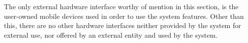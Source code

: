 The only external hardware interface worthy of mention in this section, is the user-owned mobile devices used in order to use the system features. Other than this, there are no other hardware interfaces neither provided by the system for external use, nor offered by an external entity and used by the system.